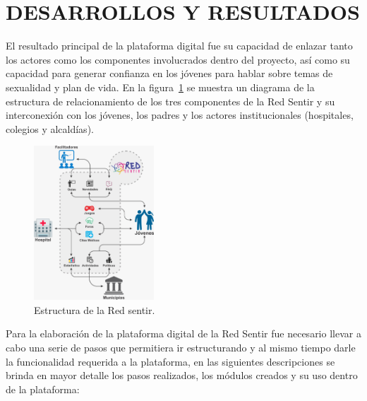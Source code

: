 \documentclass[journal,transmag]{IEEEtran}
\begin{document}
\section{DESARROLLOS Y RESULTADOS}\label{sec:resultados}

El resultado principal de la plataforma digital fue su capacidad de enlazar tanto los actores como los componentes involucrados dentro del proyecto, así como su capacidad para generar confianza en los jóvenes para hablar sobre temas de sexualidad y plan de vida. En la figura~\ref{fig:estructura} se muestra un diagrama de la estructura de relacionamiento de los tres componentes de la Red Sentir y su interconexión con los jóvenes, los padres y los actores institucionales (hospitales, colegios y alcaldías). 

\begin{figure}[t]
\centering
\includegraphics[width=0.4\textwidth]{plataforma_relacion.jpeg}
\caption{Estructura de la Red sentir.}
\label{fig:estructura}
\end{figure}

Para la elaboración de la plataforma digital de la Red Sentir fue necesario llevar a cabo una serie de pasos que permitiera ir estructurando y al mismo tiempo darle la funcionalidad requerida a la plataforma, en las siguientes descripciones se brinda en mayor detalle los pasos realizados, los módulos creados y su uso dentro de la plataforma:
\end{document}
